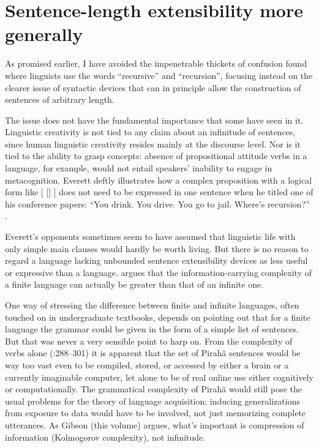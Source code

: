 \documentclass[output=paper,colorlinks,citecolor=brown
]{langscibook}
\begin{document}
\section{Sentence-length extensibility more generally}

As promised earlier, I have avoided the impenetrable thickets of confusion
found where linguists use the words ``recursive'' and ``recursion'', focusing
instead on the clearer issue of syntactic devices that can in principle
allow the construction of sentences of arbitrary length.

The issue does not have the fundamental importance that some have seen
in it. Linguistic creativity is not tied to any claim about an infinitude
of sentences, since human linguistic creativity resides mainly at the
discourse level. Nor is it tied to the ability to grasp concepts:
absence of propositional attitude verbs in a language, for example,
would not entail speakers' inability to engage in metacognition.
Everett deftly illustrates how a complex proposition with a logical
form like [ [] ]  does not need
to be expressed in one sentence when he titled one of his conference
papers: ``You drink. You drive. You go to jail. Where's recursion?''
\citep{Everett10}.

Everett's opponents sometimes seem to have assumed that linguistic
life with only simple main clauses would hardly be worth living.
But there is no reason to regard a language lacking unbounded sentence
extensibility devices as less useful or expressive than a language.
\citet{Kornai14} argues that the information-carrying complexity of
a finite language can actually be greater than that of an infinite one.

One way of stressing the difference between finite and infinite languages,
often touched on in undergraduate textbooks, depends on pointing out that
for a finite language the grammar could be given in the form of a simple
list of sentences. But that was never a very sensible point to harp on.
From the complexity of verbs alone (\citealt{Everett86HAL}:288--301)
it is apparent that the set of Pirah{\~a} sentences would be way too vast
even to be compiled, stored, or accessed by either a brain or a currently
imaginable computer, let alone to be of real online use either cognitively
or computationally. The grammatical complexity of Pirah{\~a} would still
pose the usual problems for the theory of language acquisition: inducing
generalizations from exposure to data would have to be involved, not just
memorizing complete utterances. As Gibson (this volume) argues, what's
important is compression of information (Kolmogorov complexity), not
infinitude.
\end{document}
